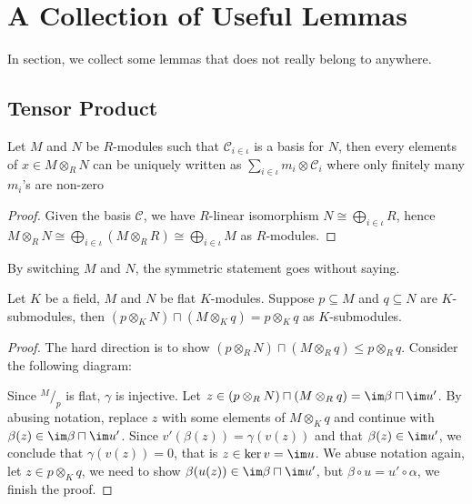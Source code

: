\section{A Collection of Useful Lemmas}\label{sec:unclassified}

In section, we collect some lemmas that does not really belong to anywhere.

\subsection{Tensor Product}

\begin{lemma}\label{lem:expand-tensor-in-basis}
  Let $M$ and $N$ be $R$-modules such that $\mathcal{C}_{i\in\iota}$ is a basis
  for $N$, then every elements of $x \in M \otimes_{R} N$ can be uniquely
  written as $\sum_{i\in\iota}m_{i}\otimes \mathcal{C}_{i}$ where only finitely
  many $m_{i}$'s are non-zero
\end{lemma}

\begin{proof}
  Given the basis $\mathcal{C}$, we have $R$-linear isomorphism
  $N \cong\bigoplus_{i\in\iota}R$, hence
  $M\otimes_{R}N \cong \bigoplus_{i\in\iota}(M\otimes_{R}R)\cong\bigoplus_{i\in\iota}M$
  as $R$-modules.
\end{proof}
By switching $M$ and $N$, the symmetric statement goes without saying.


\begin{lemma}
  \label{lem:submodule-tensor-submodule}
  Let $K$ be a field, $M$ and $N$ be flat $K$-modules. Suppose $p \subseteq M$
  and $q \subseteq N$ are $K$-submodules, then
  $(p \otimes_{K} N) \sqcap (M \otimes_{K} q) = p \otimes_{K} q$ as
  $K$-submodules.
\end{lemma}

\begin{proof}
  The hard direction is to show
  $(p \otimes_{R} N) \sqcap (M \otimes_{R} q) \le p \otimes_{R} q$. Consider the
  following diagram:
  \begin{center}
  \end{center}
  Since $^{M}/_{p}$ is flat, $\gamma$ is injective. Let
  $z \in (p \otimes_{R} N) \sqcap (M \otimes_{R} q) = \im \beta \sqcap \im u'$.
  By abusing notation, replace $z$ with some elements of $M \otimes_{K} q$ and
  continue with $\beta(z)\in\im \beta \sqcap \im u'$. Since
  $v'(\beta(z))=\gamma(v(z))$ and that $\beta(z)\in \im u'$, we conclude that
  $\gamma(v(z))=0$, that is $z\in\ker v=\im u$. We abuse notation again, let
  $z \in p \otimes_{K} q$, we need to show
  $\beta(u(z))\in\im \beta \sqcap \im u'$, but $\beta\circ u=u'\circ\alpha$, we
  finish the proof.
\end{proof}

